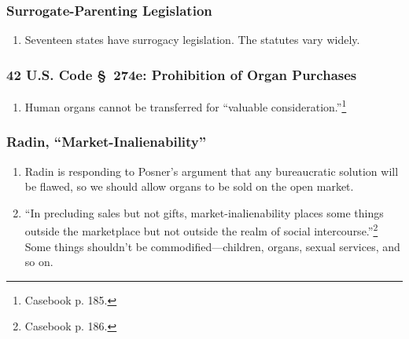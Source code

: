 \subsubsection{Surrogate-Parenting Legislation}

\begin{enumerate}
    \item Seventeen states have surrogacy legislation. The statutes vary 
    widely.
\end{enumerate}

\subsubsection{42 U.S. Code \S\ 274e: Prohibition of Organ Purchases}

\begin{enumerate}
    \item Human organs cannot be transferred for ``valuable 
    consideration.''\footnote{Casebook p. 185.}
\end{enumerate}

\subsubsection{Radin, ``Market-Inalienability''}

\begin{enumerate}
    \item Radin is responding to Posner's argument that any bureaucratic 
    solution will be flawed, so we should allow organs to be sold on the open 
    market.
    \item ``In precluding sales but not gifts, market-inalienability places 
    some things outside the marketplace but not outside the realm of social 
    intercourse.''\footnote{Casebook p. 186.} Some things shouldn't be 
    commodified---children, organs, sexual services, and so on.
\end{enumerate}
